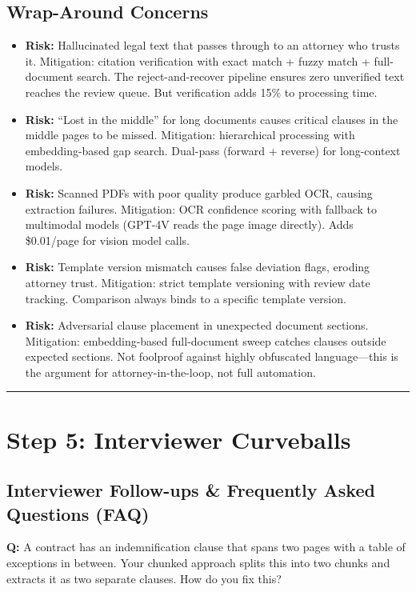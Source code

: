 \subsection*{Wrap-Around Concerns}

\begin{itemize}
  \item \textbf{Risk:} Hallucinated legal text that passes through to an attorney who trusts it. Mitigation: citation verification with exact match + fuzzy match + full-document search. The reject-and-recover pipeline ensures zero unverified text reaches the review queue. But verification adds 15\% to processing time.
  \item \textbf{Risk:} ``Lost in the middle'' for long documents causes critical clauses in the middle pages to be missed. Mitigation: hierarchical processing with embedding-based gap search. Dual-pass (forward + reverse) for long-context models.
  \item \textbf{Risk:} Scanned PDFs with poor quality produce garbled OCR, causing extraction failures. Mitigation: OCR confidence scoring with fallback to multimodal models (GPT-4V reads the page image directly). Adds \$0.01/page for vision model calls.
  \item \textbf{Risk:} Template version mismatch causes false deviation flags, eroding attorney trust. Mitigation: strict template versioning with review date tracking. Comparison always binds to a specific template version.
  \item \textbf{Risk:} Adversarial clause placement in unexpected document sections. Mitigation: embedding-based full-document sweep catches clauses outside expected sections. Not foolproof against highly obfuscated language---this is the argument for attorney-in-the-loop, not full automation.
\end{itemize}

\bigskip\hrule\bigskip

\section*{Step 5: Interviewer Curveballs}

\subsection*{Interviewer Follow-ups \& Frequently Asked Questions (FAQ)}

\textbf{Q:} A contract has an indemnification clause that spans two pages with a table of exceptions in between. Your chunked approach splits this into two chunks and extracts it as two separate clauses. How do you fix this?


